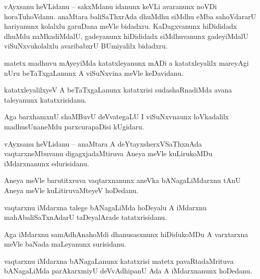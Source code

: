 \documentclass{article}
\begin{document}
\begin{mng}%
vAyxsanu heVLidanu -- sakxMdanu idanunx keVLi avaranunx noVDi horaTuhoVdanu. anaMtara baliSaThxrAda 
dhuMdhu siMdhu eMba sahoVdararU hariyanunx kolalxlu garuDana meVle bidadxru. KaDagxvanunx 
hiDididadx dhuMdu naMkadiMdalU, gadeyanunx hiDididadx siMdhuvanunx gadeyiMdalU viSuNxvukolalxlu 
avaribabxrU BUmiyalilx bidadxru.
\end{mng}

\begin{mng}%
matetx madhuvu mAyeyiMda katatxleyanunx mADi a katatxleyalilx mareyAgi nUru beTaTxgaLanunx A 
viSuNxvina meVle keDavidanu.
\end{mng}

\begin{mng}%
katatxleyalilxyeV A beTaTxgaLanunx katatxrisi sudashaRnadiMda avana taleyanunx katatxrisidanu.
\end{mng}

\begin{mng}%
Aga barxhamxnU shaMBuvU deVvategaLU I viSuNxvnaunx loVkadalilx madhusUnaneMdu parxcurapaDisi kUgidaru.
\end{mng}


\begin{mng}%
vAyxsanu heVLidanu -- anaMtara A deYtayxsherxVSaThxnAda vaqtarxneMbuvanu digagxjadaMtiruva Aneya 
meVle kuLirukoMDu iMdarxnanunx edurisidanu.
\end{mng}

\begin{mng}%
Aneya meVle barutitxruva vaqtarxnanunx aneVka bANagaLiMdarxnu tAnU Aneya meVle kuLitiruvaMteyeV 
hoDedanu.
\end{mng}

\begin{mng}%
vaqtarxnu iMdarxna talege bANagaLiMda hoDeyalu A iMdarxnu mahAbaliSaTxnAdarU taDeyalArade 
tatatxrisidanu.
\end{mng}

\begin{mng}%
Aga iMdarxnu samAdhAnahoMdi dhanusasxnunx hiDidukoMDu A varxtarxna meVle baNada maLeyanunx surisidanu.
\end{mng}

\begin{mng}%
vaqtarxnu iMdarxna bANagaLanunx katatxrisi matetx pavaRtadaMrituva bANagaLiMda parAkarxmiyU 
deVvAdhipanU Ada A iMdarxnanunx hoDedanu.
\end{mng}
\end{document}
